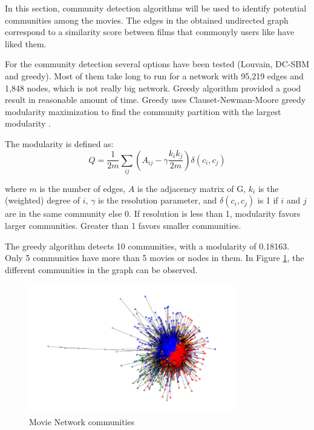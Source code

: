 \documentclass[12pt]{article}
\numberwithin{equation}{section}
\begin{document}
In this section, community detection algorithms will be used to identify potential communities among the movies. The edges in the obtained undirected graph correspond to a similarity score between films that commonyly users like have liked them. 

For the community detection several options have been tested (Louvain, DC-SBM and greedy). Most of them take long to run for a network with 95,219 edges and 1,848 nodes, which is not really big network. Greedy algorithm provided a good result in reasonable amount of time. Greedy uses Clauset-Newman-Moore greedy modularity maximization to find the community partition with the largest modularity \cite{greedy}.

The modularity is defined as: 
\begin{equation}
Q = \frac{1}{2m} \sum_{ij} ( A_{ij} - \gamma \frac{k_i k_j}{2m}) \delta (c_i, c_j)
\end{equation}

where $m$ is the number of edges, $A$ is the adjacency matrix of G, $k_i$ is the (weighted) degree of $i$, $\gamma$ is the resolution parameter, and $\delta (c_i, c_j)$ is 1 if $i$ and $j$ are in the same community else 0. If resolution is less than 1, modularity favors larger communities. Greater than 1 favors smaller communities.

The greedy algorithm detects 10 communities, with a modularity of 0.18163. Only 5 communities have more than 5 movies or nodes in them. In Figure \ref{fig:comm_detection}, the different communities in the graph can be observed.

\begin{figure}[h!]
    \centering
  	\includegraphics[width=0.8\textwidth]{community_detection.png}
  	\caption{Movie Network communities}
  	\label{fig:comm_detection}
\end{figure}
\end{document}
